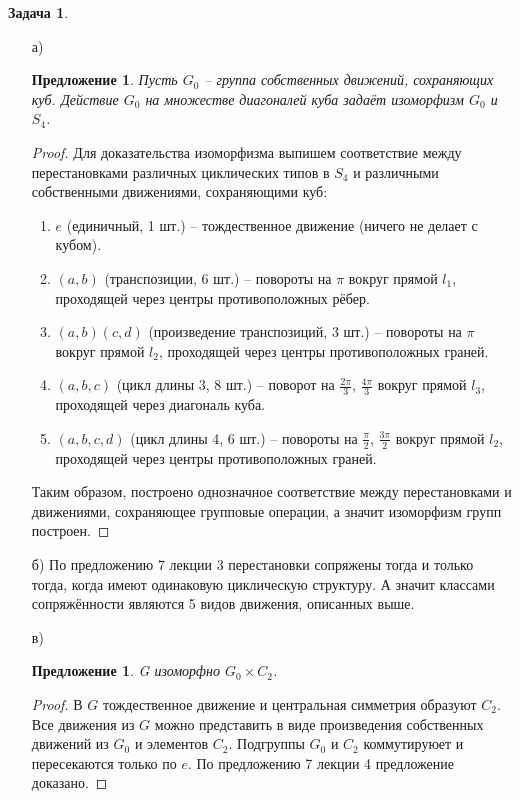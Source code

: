\documentclass[12pt]{article}
\newtheorem{predl}[theorem]{Предложение}
\theoremstyle{definition}
\newtheorem{zad}{Задача}[section]
\begin{document}
\begin{zad}
\begin{itemize}
    \item[а)]
    \begin{predl}
    Пусть $G_0$ -- группа собственных движений, сохраняющих куб. Действие $G_0$ на множестве диагоналей куба задаёт изоморфизм $G_0$ и $S_4$.
    \end{predl}
    \begin{proof}
    Для доказательства изоморфизма выпишем соответствие между перестановками различных циклических типов в $S_4$ и различными собственными движениями, сохраняющими куб:
    \begin{enumerate}
        \item $e$ (единичный, 1 шт.) -- тождественное движение (ничего не делает с кубом).
        \item $(a,b)$ (транспозиции, 6 шт.) -- повороты на $\pi$ вокруг прямой $l_1$, проходящей через центры противоположных рёбер.
        \item $(a,b)(c,d)$ (произведение транспозиций, 3 шт.) -- повороты на $\pi$ вокруг прямой $l_2$, проходящей через центры противоположных граней.
        \item $(a,b,c)$ (цикл длины 3, 8 шт.) -- поворот на $\frac{2\pi}{3}$, $\frac{4\pi}{3}$ вокруг прямой $l_3$, проходящей через диагональ куба.
        \item $(a,b,c,d)$ (цикл длины 4, 6 шт.) -- повороты на $\frac{\pi}{2}$, $\frac{3\pi}{2}$ вокруг прямой $l_2$, проходящей через центры противоположных граней.
    \end{enumerate}
    Таким образом, построено однозначное соответствие между перестановками и движениями, сохраняющее групповые операции, а значит изоморфизм групп построен.
    \end{proof}
    \item[б)]
    По предложению 7 лекции 3 перестановки сопряжены тогда и только тогда, когда имеют одинаковую циклическую структуру. А значит классами сопряжённости являются 5 видов движения, описанных выше.
    \item[в)]
    \begin{predl}
        G изоморфно $G_0\times C_2$.
    \end{predl}
    \begin{proof}
        В $G$ тождественное движение и центральная симметрия образуют $C_2$.
        Все движения из $G$ можно представить в виде произведения собственных движений из $G_0$ и элементов $C_2$. Подгруппы $G_0$ и $C_2$ коммутируюет и пересекаются только по $e$. По предложению 7 лекции 4 предложение доказано.

\end{proof}
\end{itemize}
\end{zad}
\end{document}
